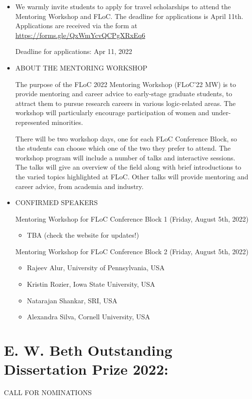 \documentclass[prodmode,acmtecs]{acmsmall} %
\begin{document}
\begin{itemize}\item  We warmly invite students to apply for travel scholarships to attend the Mentoring Workshop and FLoC.  The deadline for applications is April 11th. Applications are received via the form at \href{https://forms.gle/QxWmYcvQCPgXRxEq6}{https://forms.gle/QxWmYcvQCPgXRxEq6} 
 
Deadline for applications: Apr 11, 2022 
 
\item  ABOUT THE MENTORING WORKSHOP 
 
  The purpose of the FLoC 2022 Mentoring Workshop (FLoC'22 MW) is to provide mentoring and career advice to early-stage graduate students, to attract them to pursue research careers in various logic-related areas. The workshop will particularly encourage participation of women and under-represented minorities. 
 
  There will be two workshop days, one for each FLoC Conference Block, so the students can choose which one of the two they prefer to attend. The workshop program will include a number of talks and interactive sessions. The talks will give an overview of the field along with brief introductions to the varied topics highlighted at FLoC. Other talks will provide mentoring and career advice, from academia and industry. 
 
\item  CONFIRMED SPEAKERS 
 
  Mentoring Workshop for FLoC Conference Block 1 (Friday, August 5th, 2022)  
 
\begin{itemize}\item  TBA (check the website for updates!)
\end{itemize} 
  Mentoring Workshop for FLoC Conference Block 2 (Friday, August 5th, 2022) 
 
\begin{itemize}\item  Rajeev Alur, University of Pennsylvania, USA
\item  Kristin Rozier, Iowa State University, USA
\item  Natarajan Shankar, SRI, USA
\item  Alexandra Silva, Cornell University, USA
\end{itemize} 
\end{itemize}\section{E. W. Beth Outstanding Dissertation Prize 2022:}\label{EWBethOutstandingDissertationPrize2022}CALL FOR NOMINATIONS 
\end{document}
